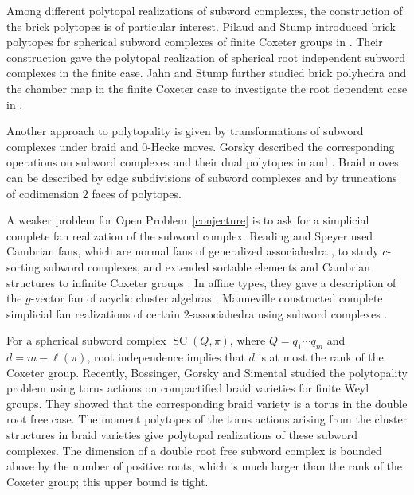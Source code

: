\documentclass[11pt,a4paper]{article}
\theoremstyle{definition}
\theoremstyle{remark}
\numberwithin{equation}{section}
\newcommand{\SCQ}{\operatorname{SC}(Q,\pi)}
\begin{document}
Among different polytopal realizations of subword complexes, the construction of the brick polytopes is of particular interest. Pilaud and Stump introduced brick polytopes for spherical subword complexes of finite Coxeter groups in \cite{PSbrick}. Their construction gave the polytopal realization of spherical root independent subword complexes in the finite case. Jahn and Stump further studied brick polyhedra and the chamber map in the finite Coxeter case to investigate the root dependent case in \cite{JS}. 


Another approach to polytopality is given by transformations of subword complexes under braid and $0$-Hecke moves. Gorsky described the corresponding operations on subword complexes and their dual polytopes in \cite{GorskyNilHecke} and \cite{GorskyBraid}. Braid moves can be described by edge subdivisions of subword complexes and by truncations of codimension $2$ faces of polytopes.

A weaker problem for Open Problem~\ref{conjecture} is to ask for a simplicial complete fan realization of the subword complex. Reading and Speyer used Cambrian fans, which are normal fans of generalized associahedra \cite{ReadingSpeyerCambrian}, to study $c$-sorting subword complexes, and extended sortable elements and Cambrian structures to infinite Coxeter groups \cite{ReadingSpeyerInfinite}. In affine types, they gave a description of the $g$-vector fan of acyclic cluster algebras \cite{ReadingSpeyerAffine}. Manneville constructed complete simplicial fan realizations of certain $2$-associahedra using subword complexes
\cite{Manneville2Associahedra}.

For a spherical subword complex $\SCQ$, where $Q=q_1\cdots q_m$ and $d=m-\ell(\pi)$, root independence implies that $d$ is at most the rank of the Coxeter group. Recently, Bossinger, Gorsky and Simental \cite{BGS} studied the polytopality problem using torus actions on compactified braid varieties for finite Weyl groups. They showed that the corresponding braid variety is a torus in the double root free case. The moment polytopes of the torus actions arising from the cluster structures in braid varieties give polytopal realizations of these subword complexes. The dimension of a double root free subword complex is bounded above by the number of positive roots, which is much larger than the rank of the Coxeter group; this upper bound is tight.
\end{document}
